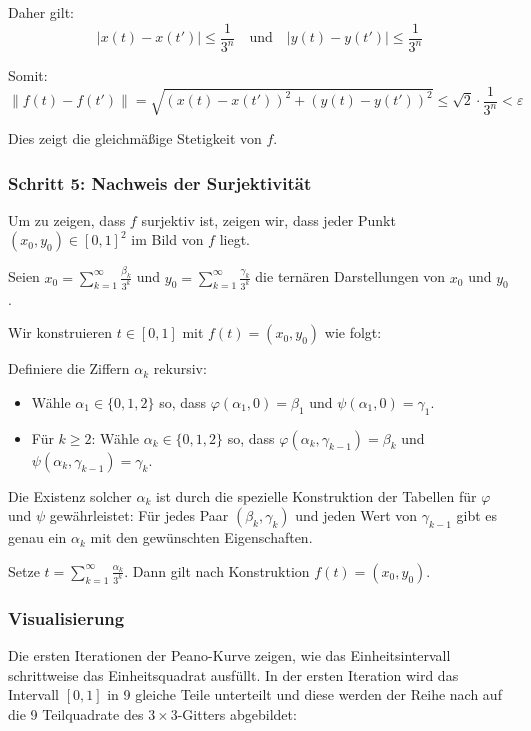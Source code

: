 \documentclass{article}
\begin{document}
Daher gilt:
$$|x(t) - x(t')| \leq \frac{1}{3^n} \quad \text{und} \quad |y(t) - y(t')| \leq \frac{1}{3^n}$$

Somit:
$$\|f(t) - f(t')\| = \sqrt{(x(t) - x(t'))^2 + (y(t) - y(t'))^2} \leq \sqrt{2} \cdot \frac{1}{3^n} < \varepsilon$$

Dies zeigt die gleichmäßige Stetigkeit von $f$.

\subsubsection*{Schritt 5: Nachweis der Surjektivität}

Um zu zeigen, dass $f$ surjektiv ist, zeigen wir, dass jeder Punkt $(x_0, y_0) \in [0,1]^2$ im Bild von $f$ liegt.

Seien $x_0 = \sum_{k=1}^{\infty} \frac{\beta_k}{3^k}$ und $y_0 = \sum_{k=1}^{\infty} \frac{\gamma_k}{3^k}$ die ternären Darstellungen von $x_0$ und $y_0$.

Wir konstruieren $t \in [0,1]$ mit $f(t) = (x_0, y_0)$ wie folgt:

Definiere die Ziffern $\alpha_k$ rekursiv:
\begin{itemize}
\item Wähle $\alpha_1 \in \{0,1,2\}$ so, dass $\varphi(\alpha_1, 0) = \beta_1$ und $\psi(\alpha_1, 0) = \gamma_1$.
\item Für $k \geq 2$: Wähle $\alpha_k \in \{0,1,2\}$ so, dass $\varphi(\alpha_k, \gamma_{k-1}) = \beta_k$ und $\psi(\alpha_k, \gamma_{k-1}) = \gamma_k$.
\end{itemize}

Die Existenz solcher $\alpha_k$ ist durch die spezielle Konstruktion der Tabellen für $\varphi$ und $\psi$ gewährleistet: Für jedes Paar $(\beta_k, \gamma_k)$ und jeden Wert von $\gamma_{k-1}$ gibt es genau ein $\alpha_k$ mit den gewünschten Eigenschaften.

Setze $t = \sum_{k=1}^{\infty} \frac{\alpha_k}{3^k}$. Dann gilt nach Konstruktion $f(t) = (x_0, y_0)$.

\subsubsection*{Visualisierung}

Die ersten Iterationen der Peano-Kurve zeigen, wie das Einheitsintervall schrittweise das Einheitsquadrat ausfüllt. In der ersten Iteration wird das Intervall $[0,1]$ in 9 gleiche Teile unterteilt und diese werden der Reihe nach auf die 9 Teilquadrate des $3 \times 3$-Gitters abgebildet:
\end{document}
